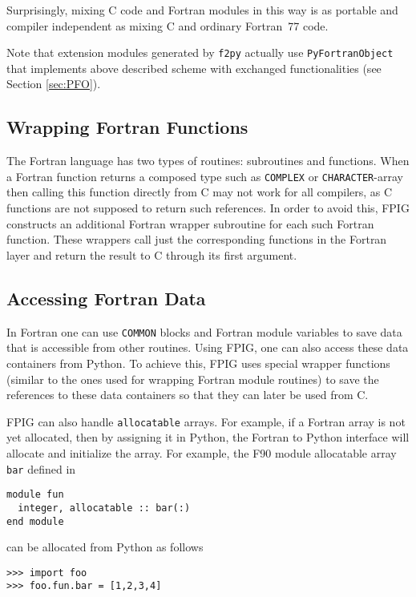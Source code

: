\documentclass[twocolumn]{article}
\newcommand{\fpy}{\texttt{f2py}\xspace}
\begin{document}
Surprisingly, mixing C code and Fortran modules in this way is as
portable and compiler independent as mixing C and ordinary Fortran~77
code.

Note that extension modules generated by \fpy actually use
\texttt{PyFortranObject} that implements above described scheme with
exchanged functionalities (see Section \ref{sec:PFO}).


\subsection{Wrapping Fortran Functions}
\label{sec:wrapfunc}

The Fortran language has two types of routines: subroutines and
functions. When a Fortran function returns a composed type such as
\texttt{COMPLEX} or \texttt{CHARACTER}-array then calling this
function directly from C may not work for all compilers, as C
functions are not supposed to return such references. In order to
avoid this, FPIG constructs an additional Fortran wrapper subroutine
for each such Fortran function. These wrappers call just the
corresponding functions in the Fortran layer and return the result to
C through its first argument.


\subsection{Accessing Fortran Data}
\label{sec:accsdata}

In Fortran one can use \texttt{COMMON} blocks and Fortran module
variables to save data that is accessible from other routines.  Using
FPIG, one can also access these data containers from Python. To achieve
this, FPIG uses special wrapper functions (similar to the ones used
for wrapping Fortran module routines) to save the references to these
data containers so that they can later be used from C.

FPIG can also handle \texttt{allocatable} arrays. For example, if a
Fortran array is not yet allocated, then by assigning it in Python,
the Fortran to Python interface will allocate and initialize the
array.  For example, the F90 module allocatable array \texttt{bar}
defined in
\begin{verbatim}
module fun
  integer, allocatable :: bar(:)
end module
\end{verbatim}
can be allocated from Python as follows
\begin{verbatim}
>>> import foo
>>> foo.fun.bar = [1,2,3,4]
\end{verbatim}
\end{document}
